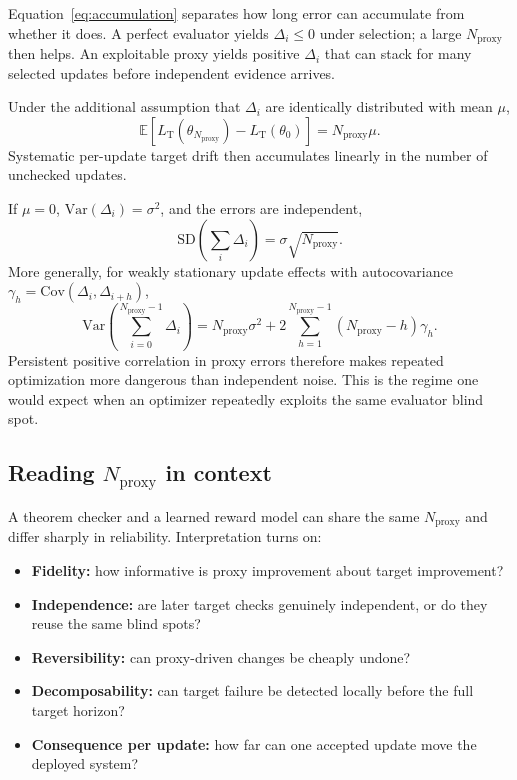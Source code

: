 \documentclass[11pt]{article}
\newcommand{\LT}{L_{\mathrm{T}}}
\newcommand{\E}{\mathbb{E}}
\newcommand{\Var}{\mathrm{Var}}
\newcommand{\Cov}{\mathrm{Cov}}
\newcommand{\Nproxy}{N_{\mathrm{proxy}}}
\begin{document}
Equation~\eqref{eq:accumulation} separates how long error can accumulate from whether it does. A perfect evaluator yields \(\Delta_i\leq0\) under selection; a large \(\Nproxy\) then helps. An exploitable proxy yields positive \(\Delta_i\) that can stack for many selected updates before independent evidence arrives.

Under the additional assumption that \(\Delta_i\) are identically distributed with mean \(\mu\),
\begin{equation}
\E\!\left[\LT(\theta_{\Nproxy})-\LT(\theta_0)\right]
=
\Nproxy\mu.
\label{eq:mean}
\end{equation}
Systematic per-update target drift then accumulates linearly in the number of unchecked updates.

If \(\mu=0\), \(\Var(\Delta_i)=\sigma^2\), and the errors are independent,
\begin{equation}
\mathrm{SD}\!\left(\sum_i\Delta_i\right)
=
\sigma\sqrt{\Nproxy}.
\end{equation}
More generally, for weakly stationary update effects with autocovariance \(\gamma_h=\Cov(\Delta_i,\Delta_{i+h})\),
\begin{equation}
\Var\!\left(\sum_{i=0}^{\Nproxy-1}\Delta_i\right)
=
\Nproxy\sigma^2
+
2\sum_{h=1}^{\Nproxy-1}(\Nproxy-h)\gamma_h.
\label{eq:correlation}
\end{equation}
Persistent positive correlation in proxy errors therefore makes repeated optimization more dangerous than independent noise. This is the regime one would expect when an optimizer repeatedly exploits the same evaluator blind spot.

\subsection{Reading \(\Nproxy\) in context}

A theorem checker and a learned reward model can share the same \(\Nproxy\) and differ sharply in reliability. Interpretation turns on:

\begin{itemize}[leftmargin=*]
    \item \textbf{Fidelity:} how informative is proxy improvement about target improvement?
    \item \textbf{Independence:} are later target checks genuinely independent, or do they reuse the same blind spots?
    \item \textbf{Reversibility:} can proxy-driven changes be cheaply undone?
    \item \textbf{Decomposability:} can target failure be detected locally before the full target horizon?
    \item \textbf{Consequence per update:} how far can one accepted update move the deployed system?
\end{itemize}
\end{document}
